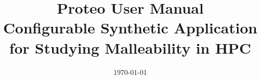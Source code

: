 \documentclass{article}
\begin{document}
\title{Proteo User Manual\\
\large Configurable Synthetic Application for Studying Malleability in HPC}

\author{}
\date{\today}

\maketitle

\tableofcontents
\newpage











\appendix

\end{document}
